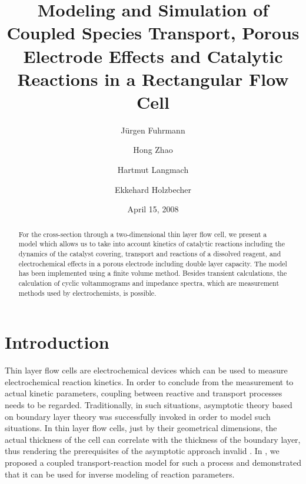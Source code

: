 \documentclass[english,nofirstpagebreak,empty]{amsproc}
\begin{document}
\title[Modeling of a  Rectangular Flow Cell]{Modeling and Simulation
of  Coupled  Species  Transport, Porous  Electrode  Effects  and
Catalytic Reactions in a
Rectangular Flow Cell}

\date{April 15, 2008}

\author{
J\"urgen Fuhrmann \and
Hong Zhao \and
Hartmut Langmach  \and
Ekkehard Holzbecher}

\begin{abstract}
  For the  cross-section through a  two-dimensional thin layer
  flow  cell, we  present  a model  which  allows us to  take into  account
  kinetics of catalytic reactions including the dynamics of the catalyst
  covering,  transport  and  reactions   of  a  dissolved  reagent,  and
  electrochemical effects  in a porous electrode  including double layer
  capacity.   The  model has  been  implemented  using  a finite  volume
  method. Besides  transient calculations, the  calculation of cyclic
  voltammograms and impedance spectra,  which are measurement
  methods  used   by  electrochemists, is possible.
\end{abstract}



\maketitle
\section{Introduction}

Thin layer flow cells are electrochemical devices which can be used to
measure electrochemical  reaction kinetics. In order  to conclude from
the  measurement  to   actual  kinetic  parameters,  coupling  between
reactive and transport processes  needs to be regarded. Traditionally,
in such  situations, asymptotic theory based on  boundary layer theory
was  successfully invoked  \cite{Leveque1928,Levich1962}  in order  to
model  such situations.   In  thin  layer flow  cells,  just by  their
geometrical dimensions, the actual thickness of the cell can correlate
with  the  thickness  of   the  boundary  layer,  thus  rendering  the
prerequisites      of     the     asymptotic      approach     invalid
\cite{FuhrmannZhaoEtAl2008xUlm}.                                     In
\cite{FuhrmannZhaoHolzbecherLangmach2008},   we  proposed   a  coupled
transport-reaction model  for such a process and  demonstrated that it
can be used for inverse modeling of reaction parameters.
\end{document}
